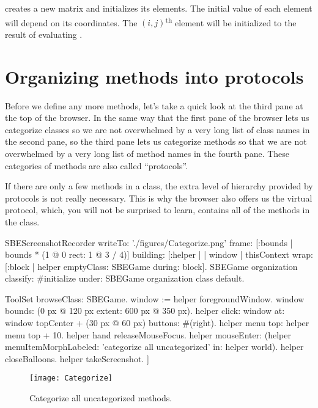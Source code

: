 \documentclass[a4paper,10pt,twoside]{book}
\begin{document}
 creates a new  matrix and initializes its elements.
The initial value of each element will depend on its coordinates.
The {$(i,j)$}\textsuperscript{th} element will be initialized to the result of evaluating .

\section{Organizing methods into protocols}

Before we define any more methods, let's take a quick look at the third pane at the top of the browser.
In the same way that the first pane of the browser lets us categorize classes so we are not overwhelmed by a very long list of class names in the second pane, so the third pane lets us categorize methods so that we are not overwhelmed by a very long list of method names in the fourth pane.
These categories of methods are also called ``protocols''.

If there are only a few methods in a class, the extra level of hierarchy provided by protocols is not really necessary.
This is why the browser also offers us the  virtual protocol, which, you will not be surprised to learn, contains all of the methods in the class.

\begin{ExecuteSmalltalkScript}
SBEScreenshotRecorder writeTo: './figures/Categorize.png' frame: [:bounds | bounds * (1 @ 0 rect: 1 @ 3 / 4)] building: [:helper |
	| window |
	thisContext wrap: [:block |
		helper emptyClass: SBEGame during: block].
	SBEGame organization classify: #initialize under: SBEGame organization class default.

	ToolSet browseClass: SBEGame.
	window := helper foregroundWindow.
	window bounds: (0 px @ 120 px extent: 600 px @ 350 px).
	helper click: window at: window topCenter + (30 px @ 60 px) buttons: #(right).
	helper menu top: helper menu top + 10.
	helper hand releaseMouseFocus.
	helper mouseEnter: (helper menuItemMorphLabeled: 'categorize all uncategorized' in: helper world).
	helper closeBalloons.
	helper takeScreenshot.
]
\end{ExecuteSmalltalkScript}
\begin{figure}[htbp]
   \texttt{[image: Categorize]}
   \caption{Categorize all uncategorized methods.\label{fig:categorize}}
\end{figure}
\end{document}
